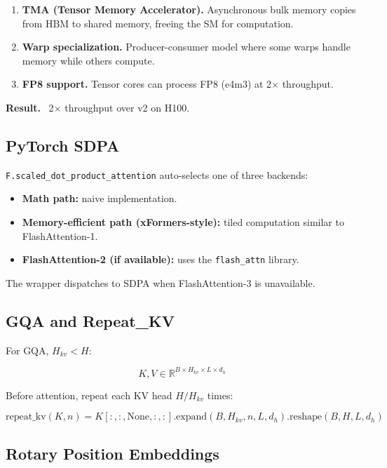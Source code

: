 \begin{enumerate}
\item \textbf{TMA (Tensor Memory Accelerator).} Asynchronous bulk memory copies
  from HBM to shared memory, freeing the SM for computation.
\item \textbf{Warp specialization.} Producer-consumer model where some warps handle
  memory while others compute.
\item \textbf{FP8 support.} Tensor cores can process FP8 (e4m3) at 2$\times$ throughput.

\end{enumerate}
\textbf{Result.} ~2$\times$ throughput over v2 on H100.

\subsection{PyTorch SDPA}

\texttt{F.scaled\_dot\_product\_attention} auto-selects one of three backends:

\begin{itemize}
\item \textbf{Math path:} naive implementation.
\item \textbf{Memory-efficient path (xFormers-style):} tiled computation similar
  to FlashAttention-1.
\item \textbf{FlashAttention-2 (if available):} uses the \texttt{flash\_attn} library.

\end{itemize}
The wrapper dispatches to SDPA when FlashAttention-3 is unavailable.

\subsection{GQA and Repeat\_KV}

For GQA, $H_{kv} < H$:

\[
K, V \in \mathbb{R}^{B \times H_{kv} \times L \times d_h}
\tag{3.6}
\]

Before attention, repeat each KV head $H/H_{kv}$ times:

\[
\text{repeat\_kv}(K, n) = K[:, :, \text{None}, :, :].\text{expand}(B, H_{kv}, n, L, d_h).\text{reshape}(B, H, L, d_h)
\tag{3.7}
\]

\subsection{Rotary Position Embeddings}

